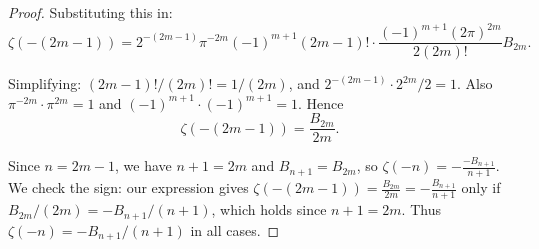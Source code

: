 \begin{proof}
    Substituting this in:
    $$\zeta(-(2m-1)) = 2^{-(2m-1)} \pi^{-2m} (-1)^{m+1} (2m-1)! \cdot \frac{(-1)^{m+1}(2\pi)^{2m}}{2(2m)!} B_{2m}.$$

    Simplifying: $(2m-1)!/(2m)! = 1/(2m)$, and $2^{-(2m-1)} \cdot 2^{2m}/2 = 1$. Also $\pi^{-2m} \cdot \pi^{2m} = 1$ and $(-1)^{m+1} \cdot (-1)^{m+1} = 1$. Hence
    $$\zeta(-(2m-1)) = \frac{B_{2m}}{2m}.$$

    Since $n = 2m-1$, we have $n+1 = 2m$ and $B_{n+1} = B_{2m}$, so $\zeta(-n) = -\frac{-B_{n+1}}{n+1}$. We check the sign: our expression gives $\zeta(-(2m-1)) = \frac{B_{2m}}{2m} = -\frac{B_{n+1}}{n+1}$ only if $B_{2m}/(2m) = -B_{n+1}/(n+1)$, which holds since $n+1 = 2m$. Thus $\zeta(-n) = -B_{n+1}/(n+1)$ in all cases.
\end{proof}